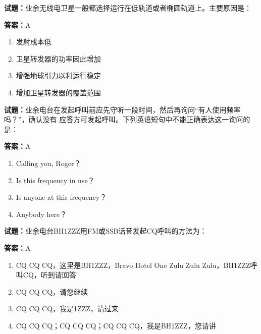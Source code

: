 \documentclass{ctexbook}
\begin{document}
\textbf{试题：}业余无线电卫星一般都选择运行在低轨道或者椭圆轨道上。主要原因是： 

\textbf{答案：}A 

\begin{enumerate}[leftmargin=3em]
  \item 发射成本低 

  \item 卫星转发器的功率因此增加 

  \item 增强地球引力以利运行稳定 

  \item 增加卫星转发器的覆盖范围 

\end{enumerate}





\vspace{1em}

\textbf{试题：}业余电台在发起呼叫前应先守听一段时间，然后再询问“有人使用频率吗？”，确认没有
应答方可发起呼叫。下列英语短句中不能正确表达这一询问的是： 

\textbf{答案：}A 

\begin{enumerate}[leftmargin=3em]
  \item Calling you, Roger？ 

  \item Is this frequency in use？ 

  \item Is anyone at this frequency？ 

  \item Anybody here？ 

\end{enumerate}






\vspace{1em}

\textbf{试题：}业余电台BH1ZZZ用FM或SSB话音发起CQ呼叫的方法为： 

\textbf{答案：}A 

\begin{enumerate}[leftmargin=3em]
  \item CQ CQ CQ，这里是BH1ZZZ，Bravo Hotel One Zulu Zulu Zulu，BH1ZZZ呼叫CQ，听到请回答 

  \item CQ CQ CQ，请您继续 

  \item CQ CQ CQ，我是1ZZZ，请过来 

  \item CQ CQ CQ；CQ CQ CQ；CQ CQ CQ，我是BH1ZZZ，您请讲 

\end{enumerate}
\end{document}

